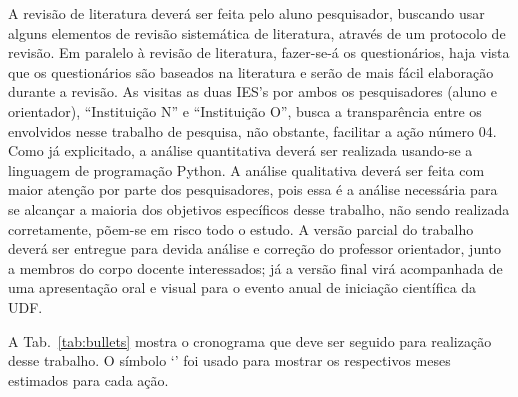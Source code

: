 \documentclass[
	arial,
	12pt,				%
	openright,			%
	oneside,
	a4paper,			%
	chapter=TITLE,		%
	english,			%
	french,				%
	spanish,			%
	brazil,				%
	]{abntex2}
\newcommand{\X}{\textbullet}
\begin{document}
A revisão de literatura deverá ser feita pelo aluno pesquisador, buscando usar alguns elementos de revisão sistemática de literatura, através de um protocolo de revisão. Em paralelo à revisão de literatura, fazer-se-á os questionários, haja vista que os questionários são baseados na literatura e serão de mais fácil elaboração durante a revisão. As visitas as duas IES's por ambos os pesquisadores (aluno e orientador), ``Instituição N'' e ``Instituição O'', busca a transparência entre os envolvidos nesse trabalho de pesquisa, não obstante, facilitar a ação número 04. Como já explicitado, a análise quantitativa deverá ser realizada usando-se a linguagem de programação Python. A análise qualitativa deverá ser feita com maior atenção por parte dos pesquisadores, pois essa é a análise necessária para se alcançar a maioria dos objetivos específicos desse trabalho, não sendo realizada corretamente, põem-se em risco todo o estudo. A versão parcial do trabalho deverá ser entregue para devida análise e correção do professor orientador, junto a membros do corpo docente interessados; já a versão final virá acompanhada de uma apresentação oral e visual para o evento anual de iniciação científica da UDF.

	
	A Tab.~\ref{tab:bullets} mostra o cronograma que deve ser seguido para realização desse trabalho. O símbolo
	`\X' foi usado para mostrar os respectivos meses estimados para cada ação.
	
\end{document}

